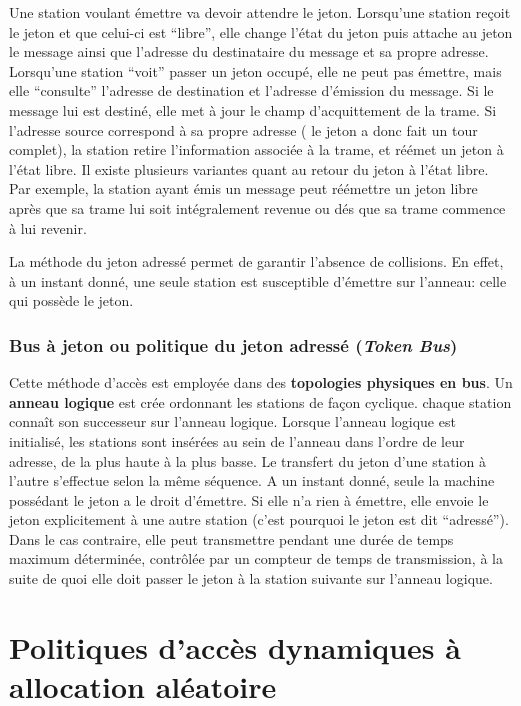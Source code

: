 \documentclass[11pt,english,french]{scrreprt}
\theoremstyle{remark}
\theoremstyle{definition}
\begin{document}
Une station voulant émettre va devoir attendre le jeton. Lorsqu'une station reçoit le jeton et que celui-ci est “libre”, elle change l'état du jeton puis attache au jeton le message ainsi que l'adresse du destinataire du message et sa propre adresse. Lorsqu'une station “voit” passer un jeton occupé, elle ne peut pas émettre, mais elle “consulte” l'adresse de destination et l'adresse d'émission du message. Si le message lui est destiné, elle met à jour le champ d'acquittement de la trame. Si l'adresse source correspond à sa propre adresse ( le jeton a donc fait un tour complet), la station retire l'information associée à la trame, et réémet un jeton à l'état libre. Il existe plusieurs variantes quant au retour du jeton à l'état libre. Par exemple, la station ayant émis un message peut réémettre un jeton libre après que sa trame lui soit intégralement revenue ou dés que sa trame commence à lui revenir.

La méthode du jeton adressé permet de garantir l'absence de collisions. En effet, à un instant donné, une seule station est susceptible d'émettre sur l'anneau: celle qui possède le jeton.

\subsubsection{Bus à jeton ou politique du jeton adressé (\emph{Token Bus})} %

Cette méthode d'accès est employée dans des \textbf{topologies physiques en bus}. Un \textbf{anneau logique} est crée ordonnant les stations de façon cyclique. chaque station connaît son successeur sur l'anneau logique. Lorsque l'anneau logique est initialisé, les stations sont insérées au sein de l'anneau dans l'ordre de leur adresse, de la plus haute à la plus basse. Le transfert du jeton d'une station à l'autre s'effectue selon la même séquence. A un instant donné, seule la machine possédant le jeton a le droit d'émettre. Si elle n'a rien à émettre, elle envoie le jeton explicitement à une autre station (c'est pourquoi le jeton est dit “adressé”). Dans le cas contraire, elle peut transmettre pendant une durée de temps maximum déterminée, contrôlée par un compteur de temps de transmission, à la suite de quoi elle doit passer le jeton à la station suivante sur l'anneau logique.

\section{Politiques d'accès dynamiques à allocation aléatoire}
\end{document}
